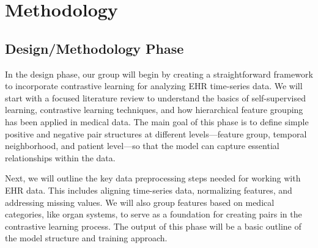 \documentclass[a4paper]{article}
\begin{document}
\section{Methodology}

\subsection{Design/Methodology Phase}
In the design phase, our group will begin by creating a straightforward framework to incorporate contrastive learning for analyzing EHR time-series data. We will start with a focused literature review to understand the basics of self-supervised learning, contrastive learning techniques, and how hierarchical feature grouping has been applied in medical data. The main goal of this phase is to define simple positive and negative pair structures at different levels—feature group, temporal neighborhood, and patient level—so that the model can capture essential relationships within the data.

Next, we will outline the key data preprocessing steps needed for working with EHR data. This includes aligning time-series data, normalizing features, and addressing missing values. We will also group features based on medical categories, like organ systems, to serve as a foundation for creating pairs in the contrastive learning process. The output of this phase will be a basic outline of the model structure and training approach.
\end{document}
